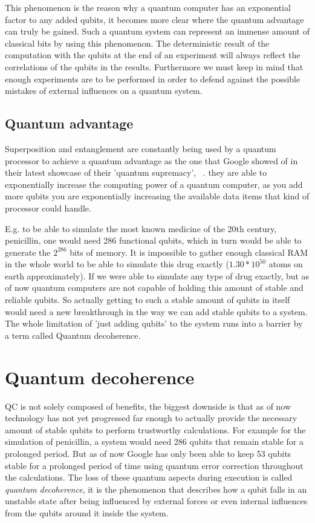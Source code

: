 This phenomenon is the reason why a quantum computer has an exponential factor to any added qubits, it becomes more clear where the quantum advantage can truly be gained. Such a quantum system can represent an immense amount of classical bits by using this phenomenon. The deterministic result of the computation with the qubits at the end of an experiment will always reflect the correlations of the qubits in the results. Furthermore we must keep in mind that enough experiments are to be performed in order to defend against the possible mistakes of external influences on a quantum system.
~\autocite{fern2016mathematics}

\subsection{Quantum advantage}
Superposition and entanglement are constantly being used by a quantum processor to achieve a quantum advantage as the one that Google showed of in their latest showcase of their 'quantum supremacy', ~\textcite{Google2019}. they are able to exponentially increase the computing power of a quantum computer, as you add more qubits you are exponentially increasing the available data items that kind of processor could handle. 

E.g. to be able to simulate the most known medicine of the 20th century, penicillin, one would need 286 functional qubits, which in turn would be able to generate the $2^{286}$ bits of memory. It is impossible to gather enough classical RAM in the whole world to be able to simulate this drug exactly ($1.30 * 10^{50}$ atoms on earth approximately). If we were able to simulate any type of drug exactly, but as of now quantum computers are not capable of holding this amount of stable and reliable qubits. So actually getting to such a stable amount of qubits in itself would need a new breakthrough in the way we can add stable qubits to a system. The whole limitation of 'just adding qubits' to the system runs into a barrier by a term called Quantum decoherence.

\section{Quantum decoherence}

QC is not solely composed of benefits, the biggest downside is that as of now technology has not yet progressed far enough to actually provide the necessary amount of stable qubits to perform trustworthy calculations. For example for the simulation of penicillin, a system would need 286 qubits that remain stable for a prolonged period. But as of now  Google has only been able to keep 53 qubits stable for a prolonged period of time using quantum error correction throughout the calculations. The loss of these quantum aspects during execution is called \textit{quantum decoherence}, it is the phenomenon that describes how a qubit falls in an unstable state after being influenced by external forces or even internal influences from the qubits around it inside the system.

